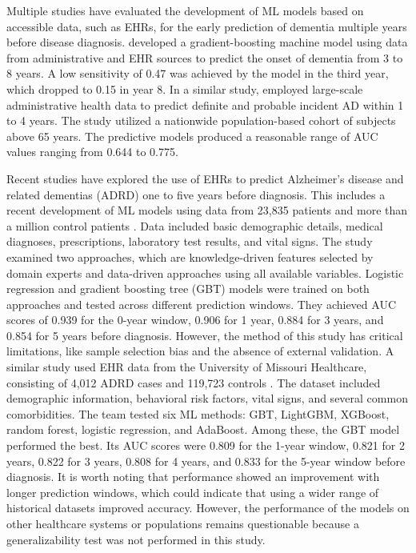 Multiple studies have evaluated the development of ML models based on accessible data, such as EHRs, for the early prediction of dementia multiple years before disease diagnosis.  developed a gradient-boosting machine model using data from administrative and EHR sources to predict the onset of dementia from 3 to 8 years. A low sensitivity of 0.47 was achieved by the model in the third year, which dropped to 0.15 in year 8. In a similar study,  employed large-scale administrative health data to predict definite and probable incident AD within 1 to 4 years. The study utilized a nationwide population-based cohort of subjects above 65 years. The predictive models produced a reasonable range of AUC values ranging from 0.644 to 0.775.

Recent studies have explored the use of EHRs to predict Alzheimer’s disease and related dementias (\acrshort{ADRD}) one to five years before diagnosis. This includes a recent development of ML models using data from 23,835 patients and more than a million control patients \cite{Li2023Early}. Data included basic demographic details, medical diagnoses, prescriptions, laboratory test results, and vital signs.  The study examined two approaches, which are knowledge-driven features selected by domain experts and data-driven approaches using all available variables. Logistic regression and gradient boosting tree (\acrshort{GBT}) models were trained on both approaches and tested across different prediction windows. They achieved AUC scores of 0.939 for the 0-year window, 0.906 for 1 year, 0.884 for 3 years, and 0.854 for 5 years before diagnosis. However, the method of this study has critical limitations, like sample selection bias and the absence of external validation. A similar study used EHR data from the University of Missouri Healthcare, consisting of 4,012 ADRD cases and 119,723 controls \cite{Akter2025Using}. The dataset included demographic information, behavioral risk factors, vital signs, and several common comorbidities. The team tested six ML methods: GBT, \acrshort{LightGBM}, XGBoost, random forest, logistic regression, and AdaBoost. Among these, the GBT model performed the best. Its AUC scores were 0.809 for the 1-year window, 0.821 for 2 years, 0.822 for 3 years, 0.808 for 4 years, and 0.833 for the 5-year window before diagnosis. It is worth noting that performance showed an improvement with longer prediction windows, which could indicate that using a wider range of historical datasets improved accuracy. However, the performance of the models on other healthcare systems or populations remains questionable because a generalizability test was not performed in this study.


